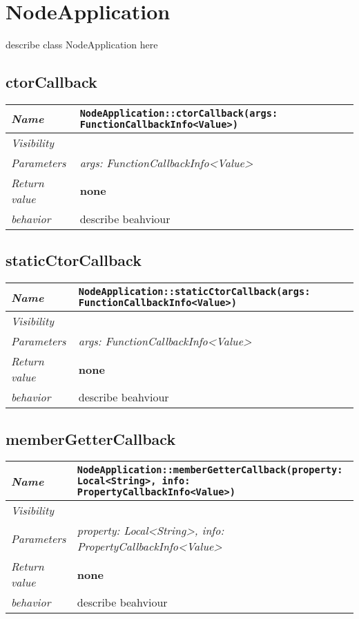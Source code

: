 \chapter{NodeApplication}
describe class NodeApplication here
\section{ctorCallback}
\begin{longtable}{p{3cm} @{\hskip 1cm} p{12cm}}
 \hline
\textit{Name} & \texttt{NodeApplication::ctorCallback(args: FunctionCallbackInfo<Value>)}\\
\hline
 \textit{Visibility} & \\
\hline
\textit{Parameters} & \textit{args: FunctionCallbackInfo<Value>}\\
\hline
\textit{Return value} & \textbf{none}\\
  \hline
 \textit{behavior} & describe beahviour \\
\hline
\end{longtable} \pagebreak
 \section{staticCtorCallback}
\begin{longtable}{p{3cm} @{\hskip 1cm} p{12cm}}
 \hline
\textit{Name} & \texttt{NodeApplication::staticCtorCallback(args: FunctionCallbackInfo<Value>)}\\
\hline
 \textit{Visibility} & \\
\hline
\textit{Parameters} & \textit{args: FunctionCallbackInfo<Value>}\\
\hline
\textit{Return value} & \textbf{none}\\
  \hline
 \textit{behavior} & describe beahviour \\
\hline
\end{longtable} \pagebreak
 \section{memberGetterCallback}
\begin{longtable}{p{3cm} @{\hskip 1cm} p{12cm}}
 \hline
\textit{Name} & \texttt{NodeApplication::memberGetterCallback(property: Local<String>, info: PropertyCallbackInfo<Value>)}\\
\hline
 \textit{Visibility} & \\
\hline
\textit{Parameters} & \textit{property: Local<String>, info: PropertyCallbackInfo<Value>}\\
\hline
\textit{Return value} & \textbf{none}\\
  \hline
 \textit{behavior} & describe beahviour \\
\hline
\end{longtable} \pagebreak
